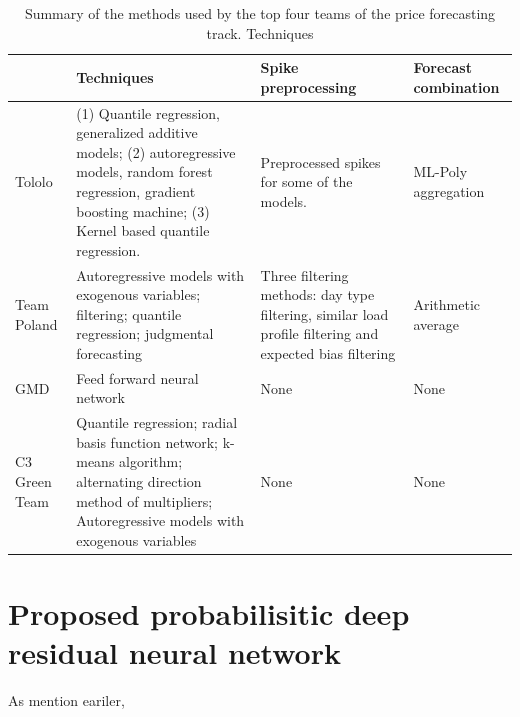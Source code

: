 \documentclass[review]{elsarticle}
\begin{document}
    \begin{table}[H]
      \caption{Summary of the methods used by the top four teams of the price forecasting track. Techniques}
      \label{table:GEFCOm2014}
      \begin{tabular}{p{2cm}p{5cm}p{3cm}p{3cm}}
      \hline
                             & Techniques                                                                                                                                                                  & Spike preprocessing                                                                                     & Forecast combination \\ \hline
      Tololo                 & (1) Quantile regression, generalized additive models; (2) autoregressive models, random forest regression, gradient boosting machine; (3) Kernel based quantile regression. & Preprocessed spikes for some of the models.                                                             & ML-Poly aggregation  \\
      Team Poland            & Autoregressive models with exogenous variables; filtering; quantile regression; judgmental forecasting                                                                      & Three filtering methods: day type filtering, similar load profile filtering and expected bias filtering & Arithmetic average   \\
      GMD                    & Feed forward neural network                                                                                                                                                 & None                                                                                                    & None                 \\
      C3 Green Team          & Quantile regression; radial basis function network; k-means algorithm; alternating direction method of multipliers; Autoregressive models with exogenous variables          & None                                                                                                    & None                 \\ \hline
      \end{tabular}

    \end{table}

\section{Proposed probabilisitic deep residual neural network}
  As mention eariler,
\end{document}
